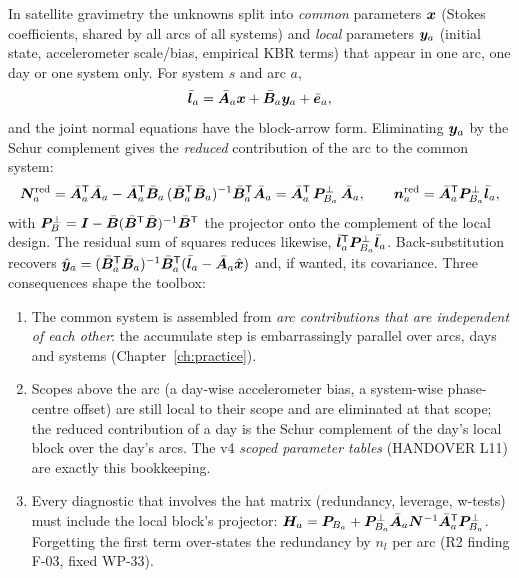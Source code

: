 In satellite gravimetry the unknowns split into \emph{common} parameters $\bm{x}$ (Stokes coefficients, shared by all arcs of all systems) and \emph{local} parameters $\bm{y}_a$ (initial state, accelerometer scale/bias, empirical KBR terms) that appear in one arc, one day or one system only. For system $s$ and arc $a$,
\begin{equation}
\bar{\bm{l}}_a = \bar{\bm{A}}_a\bm{x} + \bar{\bm{B}}_a\bm{y}_a + \bar{\bm{e}}_a ,
\end{equation}
and the joint normal equations have the block-arrow form. Eliminating $\bm{y}_a$ by the Schur complement gives the \emph{reduced} contribution of the arc to the common system:
\begin{equation}
\bm{N}_{a}^{\mathrm{red}} = \bar{\bm{A}}_a^{\mathsf T}\bar{\bm{A}}_a - \bar{\bm{A}}_a^{\mathsf T}\bar{\bm{B}}_a\,(\bar{\bm{B}}_a^{\mathsf T}\bar{\bm{B}}_a)^{-1}\bar{\bm{B}}_a^{\mathsf T}\bar{\bm{A}}_a
= \bar{\bm{A}}_a^{\mathsf T}\,\bm{P}^{\perp}_{B_a}\,\bar{\bm{A}}_a, \qquad
\bm{n}_a^{\mathrm{red}} = \bar{\bm{A}}_a^{\mathsf T}\bm{P}^{\perp}_{B_a}\bar{\bm{l}}_a,
\label{eq:schur}
\end{equation}
with $\bm{P}^{\perp}_{B} = \bm{I} - \bar{\bm{B}}(\bar{\bm{B}}^{\mathsf T}\bar{\bm{B}})^{-1}\bar{\bm{B}}^{\mathsf T}$ the projector onto the complement of the local design. The residual sum of squares reduces likewise, $\bar{\bm{l}}_a^{\mathsf T}\bm{P}^{\perp}_{B_a}\bar{\bm{l}}_a$. Back-substitution recovers $\hat{\bm{y}}_a = (\bar{\bm{B}}_a^{\mathsf T}\bar{\bm{B}}_a)^{-1}\bar{\bm{B}}_a^{\mathsf T}(\bar{\bm{l}}_a - \bar{\bm{A}}_a\hat{\bm{x}})$ and, if wanted, its covariance. Three consequences shape the toolbox:
\begin{enumerate}
\item The common system is assembled from \emph{arc contributions that are independent of each other}: the accumulate step is embarrassingly parallel over arcs, days and systems (Chapter~\ref{ch:practice}).
\item Scopes above the arc (a day-wise accelerometer bias, a system-wise phase-centre offset) are still local to their scope and are eliminated at that scope; the reduced contribution of a day is the Schur complement of the day's local block over the day's arcs. The v4 \emph{scoped parameter tables} (HANDOVER L11) are exactly this bookkeeping.
\item Every diagnostic that involves the hat matrix (redundancy, leverage, w-tests) must include the local block's projector: $\bm{H}_a = \bm{P}_{B_a} + \bm{P}^{\perp}_{B_a}\bar{\bm{A}}_a\bm{N}^{-1}\bar{\bm{A}}_a^{\mathsf T}\bm{P}^{\perp}_{B_a}$. Forgetting the first term over-states the redundancy by $n_{l}$ per arc (R2 finding F-03, fixed WP-33).
\end{enumerate}

